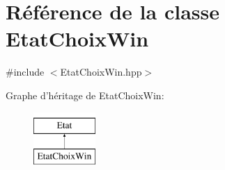 \hypertarget{class_etat_choix_win}{\section{Référence de la classe Etat\-Choix\-Win}
\label{class_etat_choix_win}
}


{\ttfamily \#include $<$Etat\-Choix\-Win.\-hpp$>$}

Graphe d'héritage de Etat\-Choix\-Win\-:\begin{figure}[H]
\begin{center}
\leavevmode
\includegraphics[height=2.000000cm]{class_etat_choix_win}
\end{center}
\end{figure}
